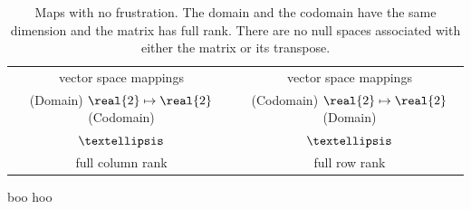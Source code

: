 \begin{table}[htdp]
\begin{center}
\begin{tabular}{cc}
vector space mappings & vector space mappings\\
(Domain) $\real{2} \mapsto \real{2}$ (Codomain) & (Codomain) $\real{2} \mapsto \real{2}$ (Domain)\\
 $\textellipsis$ & $\textellipsis$ \\
 full column rank  & full row rank\\[10pt]
\end{tabular}
\end{center}
\label{tab:interpII:a}
\caption{Maps with no frustration. The domain and the codomain have the same dimension and the matrix has full rank. There are no null spaces associated with either the matrix or its transpose.}
\end{table}%

boo hoo

\clearpage
